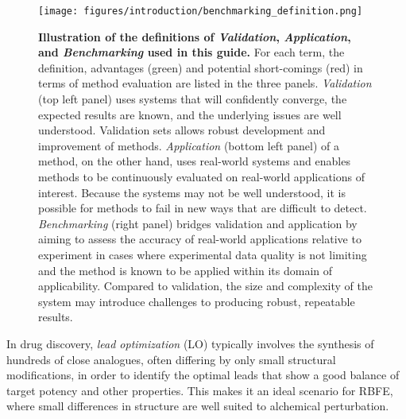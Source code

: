 \documentclass[9pt,bestpractices,pubversion]{livecoms}
\begin{document}
\begin{figure}[!ht]
    \centering
    \texttt{[image: figures/introduction/benchmarking\_definition.png]}
    \caption{
    \textbf{Illustration of the definitions of \textit{Validation}, \textit{Application}, and \textit{Benchmarking} used in this guide.} 
    For each term, the definition, advantages (green) and potential short-comings (red) in terms of method evaluation are listed in the three panels.
    \textit{Validation} (top left panel) uses systems that will confidently converge, the expected results are known, and the underlying issues are well understood. 
    Validation sets allows robust development and improvement of methods.
    \textit{Application} (bottom left panel) of a method, on the other hand, uses real-world systems and enables methods to be continuously evaluated on real-world applications of interest.
    Because the systems may not be well understood, it is possible for methods to fail in new ways that are difficult to detect.
    \textit{Benchmarking} (right panel) bridges validation and application by aiming to assess the accuracy of real-world applications relative to experiment in cases where experimental data quality is not limiting and the method is known to be applied within its domain of applicability. 
    Compared to validation, the size and complexity of the system may introduce challenges to producing robust, repeatable results.
    }%
    \label{fig:benchmarking_definition}
\end{figure}%

In drug discovery, \emph{lead optimization} (LO) typically involves the synthesis of hundreds of close analogues, often differing by only small structural modifications, in order to identify the optimal leads that show a good balance of target potency and other properties. 
This makes it an ideal scenario for RBFE, where small differences in structure are well suited to alchemical perturbation. 
\end{document}
